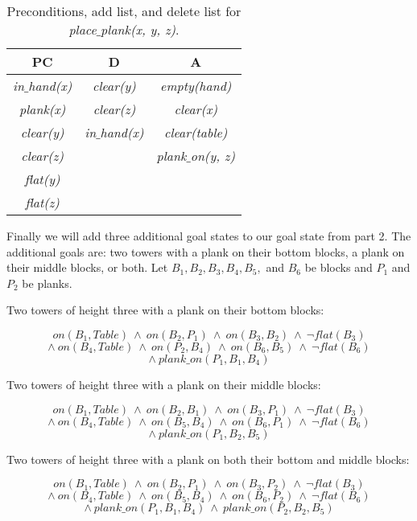 \documentclass[11pt, letterpaper]{hw}
\begin{document}
\begin{enumerate}
\begin{table}[H]
\centering
{\renewcommand{\arraystretch}{1.2}%
\begin{tabular}{| c | c | c |}
\hline
\textbf{PC} & \textbf{D} & \textbf{A}\\
\hline
\textit{in$\_$hand(x)} & \textit{clear(y)}& \textit{empty(hand)}\\ \hline
\textit{plank(x)}& \textit{clear(z)} &  \textit{clear(x)}\\ \hline
\textit{clear(y)} & \textit{in$\_$hand(x)}& \textit{clear(table)}\\ \hline
\textit{clear(z)} &  &  \textit{plank$\_$on(y, z)}\\ \hline
\textit{flat(y)} & & \\ \hline
\textit{flat(z)} &  &  \\ \hline
\end{tabular}}
\caption{Preconditions, add list, and delete list for \textit{place$\_$plank(x, y, z)}.}
\end{table}

Finally we will add three additional goal states to our goal state from part 2. The additional goals are: two towers with a plank on their bottom blocks, a plank on their middle blocks, or both. Let $B_1, B_2, B_3, B_4, B_5,$ and $B_6$ be blocks and $P_1$ and $P_2$ be planks.

Two towers of height three with a plank on their bottom blocks:

$$on(B_1, Table) \ \wedge \ on(B_2, P_1) \ \wedge \ on(B_3, B_2) \ \wedge \ \neg flat(B_3)$$
$$\wedge \ on(B_4, Table) \ \wedge \ on(P_2, B_4) \ \wedge \ on(B_6, B_5) \ \wedge \ \neg flat(B_6) $$
$$\wedge \ plank\_on(P_1, B_1, B_4)$$

Two towers of height three with a plank on their middle blocks:

$$on(B_1, Table) \ \wedge \ on(B_2, B_1) \ \wedge \ on(B_3, P_1) \ \wedge \ \neg flat(B_3)$$
$$\wedge \ on(B_4, Table) \ \wedge \ on(B_5, B_4) \ \wedge \ on(B_6, P_1) \ \wedge \ \neg flat(B_6) $$
$$\wedge \ plank\_on(P_1, B_2, B_5)$$

Two towers of height three with a plank on both their bottom and middle blocks:

$$on(B_1, Table) \ \wedge \ on(B_2, P_1) \ \wedge \ on(B_3, P_2) \ \wedge \ \neg flat(B_3)$$
$$\wedge \ on(B_4, Table) \ \wedge \ on(B_5, B_4) \ \wedge \ on(B_6, P_2) \ \wedge \ \neg flat(B_6) $$
$$\wedge \ plank\_on(P_1, B_1, B_4) \ \wedge \ plank\_on(P_2, B_2, B_5)$$

\end{enumerate}
\end{document}
